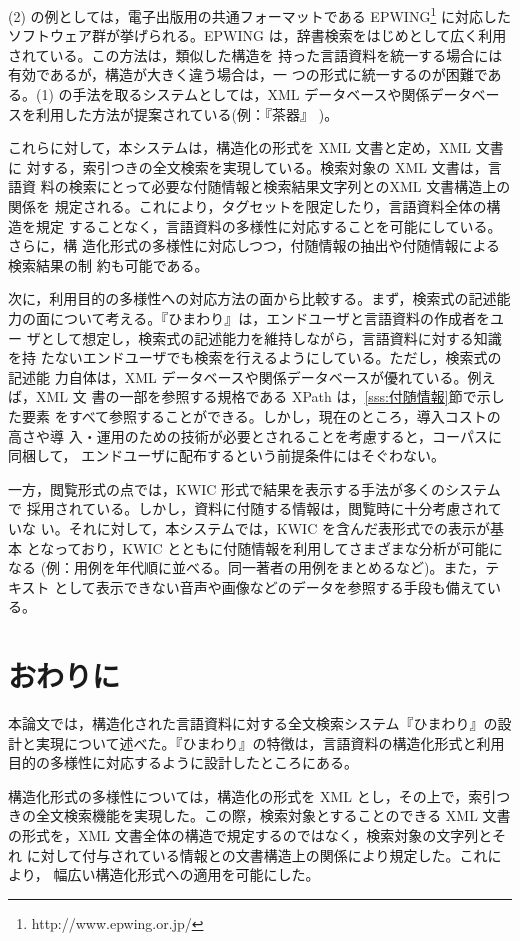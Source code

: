 (2) の例としては，電子出版用の共通フォーマットである EPWING\footnote{
http://www.epwing.or.jp/} に対応したソフトウェア群が挙げられる。EPWING 
は，辞書検索をはじめとして広く利用されている。この方法は，類似した構造を
持った言語資料を統一する場合には有効であるが，構造が大きく違う場合は，一
つの形式に統一するのが困難である。(1) の手法を取るシステムとしては，XML 
データベースや関係データベースを利用した方法が提案されている(例：『茶器』
)。


これらに対して，本システムは，構造化の形式を XML 文書と定め，XML 文書に
対する，索引つきの全文検索を実現している。検索対象の XML 文書は，言語資
料の検索にとって必要な付随情報と検索結果文字列とのXML 文書構造上の関係を
規定される。これにより，タグセットを限定したり，言語資料全体の構造を規定
することなく，言語資料の多様性に対応することを可能にしている。さらに，構
造化形式の多様性に対応しつつ，付随情報の抽出や付随情報による検索結果の制
約も可能である。


次に，利用目的の多様性への対応方法の面から比較する。まず，検索式の記述能
力の面について考える。『ひまわり』は，エンドユーザと言語資料の作成者をユー
ザとして想定し，検索式の記述能力を維持しながら，言語資料に対する知識を持
たないエンドユーザでも検索を行えるようにしている。ただし，検索式の記述能
力自体は，XML データベースや関係データベースが優れている。例えば，XML 文
書の一部を参照する規格である XPath は，\ref{sss:付随情報}節で示した要素
をすべて参照することができる。しかし，現在のところ，導入コストの高さや導
入・運用のための技術が必要とされることを考慮すると，コーパスに同梱して，
エンドユーザに配布するという前提条件にはそぐわない。

一方，閲覧形式の点では，KWIC 形式で結果を表示する手法が多くのシステムで
採用されている。しかし，資料に付随する情報は，閲覧時に十分考慮されていな
い。それに対して，本システムでは，KWIC を含んだ表形式での表示が基本
となっており，KWIC とともに付随情報を利用してさまざまな分析が可能になる
(例：用例を年代順に並べる。同一著者の用例をまとめるなど)。また，テキスト
として表示できない音声や画像などのデータを参照する手段も備えている。

\section{おわりに}
本論文では，構造化された言語資料に対する全文検索システム『ひまわり』の設
計と実現について述べた。『ひまわり』の特徴は，言語資料の構造化形式と利用
目的の多様性に対応するように設計したところにある。

構造化形式の多様性については，構造化の形式を XML とし，その上で，索引つ
きの全文検索機能を実現した。この際，検索対象とすることのできる XML 文書
の形式を，XML 文書全体の構造で規定するのではなく，検索対象の文字列とそれ
に対して付与されている情報との文書構造上の関係により規定した。これにより，
幅広い構造化形式への適用を可能にした。

